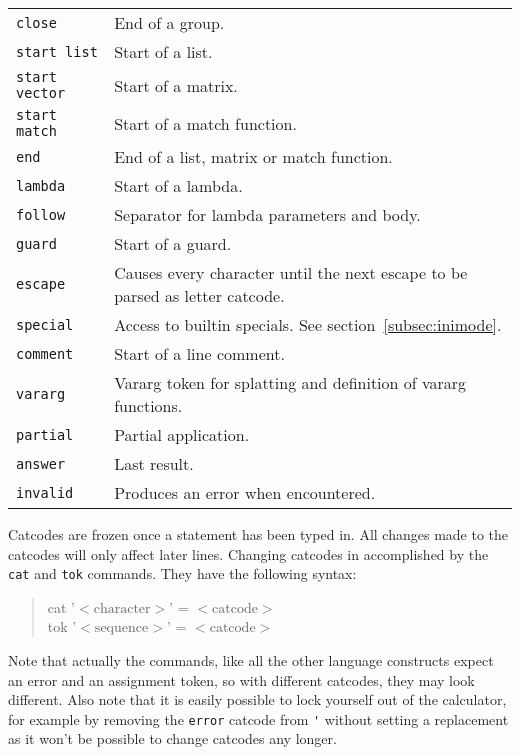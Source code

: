 \documentclass[10pt]{article}
\newcommand{\argument}[1]{{${\big<}\mathrm{#1}{\big>}$}}
\newenvironment{code}{\begin{quote}\ttfamily}{\end{quote}}
\begin{document}
\begin{longtable}{p{}p{}}
        \verb|close|        & End of a group. \\
        \verb|start list|   & Start of a list. \\
        \verb|start vector| & Start of a matrix. \\
        \verb|start match|  & Start of a match function. \\
        \verb|end|          & End of a list, matrix or match function. \\
        \verb|lambda|       & Start of a lambda. \\
        \verb|follow|       & Separator for lambda parameters and body. \\
        \verb|guard |       & Start of a guard. \\
        \verb|escape|       & Causes every character until the next escape to be parsed as letter catcode. \\
        \verb|special|      & Access to builtin specials. See section~\ref{subsec:inimode}. \\
        \verb|comment|      & Start of a line comment. \\
        \verb|vararg|       & Vararg token for splatting and definition of vararg functions. \\
        \verb|partial|      & Partial application. \\
        \verb|answer|       & Last result. \\
        \verb|invalid|      & Produces an error when encountered. \\
    \end{longtable}
    Catcodes are frozen once a statement has been typed in.
    All changes made to the catcodes will only affect later lines.
    Changing catcodes in accomplished by the \verb|cat| and \verb|tok| commands.
    They have the following syntax:
    \begin{code}
        cat '\argument{character}' = \argument{catcode} \\
        tok '\argument{sequence}' = \argument{catcode}
    \end{code}
    Note that actually the commands, like all the other language constructs expect an error and an assignment token, so with different catcodes, they may look different.
    Also note that it is easily possible to lock yourself out of the calculator, for example by removing the \verb|error| catcode from \verb|'| without setting a replacement as it won't be possible to change catcodes any longer.
    
\end{document}
